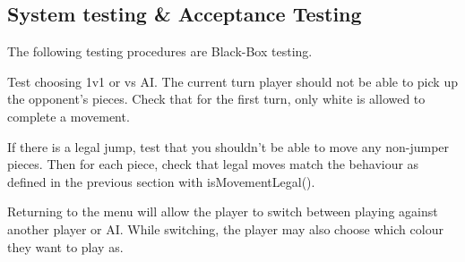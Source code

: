 \documentclass{article}
\begin{document}
\subsection{System testing \& Acceptance Testing}
The following testing procedures are Black-Box testing.

Test choosing 1v1 or vs AI.
The current turn player should not be able to pick up the opponent's pieces.
Check that for the first turn, only white is allowed to complete a movement.

If there is a legal jump, test that you shouldn't be able to move any non-jumper pieces.
Then for each piece, check that legal moves match the behaviour as defined in the previous section with isMovementLegal().

Returning to the menu will allow the player to switch between playing against another player or AI. 
While switching, the player may also choose which colour they want to play as.

\end{document}
